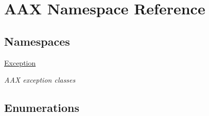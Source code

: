 \hypertarget{a00852}{}\section{A\+AX Namespace Reference}
\label{a00852}
\subsection*{Namespaces}
\begin{DoxyCompactItemize}
\item 
 \mbox{\hyperlink{a00853}{Exception}}
\begin{DoxyCompactList}\small\item\em A\+AX exception classes \end{DoxyCompactList}\end{DoxyCompactItemize}
\subsection*{Enumerations}
